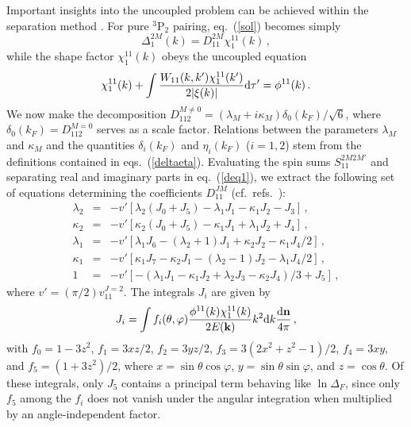 Important insights into the uncoupled problem can be achieved
within the separation method \cite {univ}.  For pure $^3$P$_2$ pairing,
eq.~(\ref{sol}) becomes simply
\begin{equation}
\Delta^{2M}_1(k)=D^{2M}_{11}\chi_1^{11}(k) \, ,
\label{dchi}
\end{equation}
while the shape factor $\chi_1^{11}(k)$ obeys the uncoupled equation
\begin{equation}
\chi_1^{11}(k) + \int \frac{W_{11}(k,k')\chi_1^{11}(k')}
        {2|\xi(k)|}{\rm d}\tau' =  \phi^{11}(k ) \,.
\label{samechi}
\end{equation}
We now make the decomposition 
$D^{M\neq 0}_{112}=(\lambda_M+i\kappa_M)\delta_0(k_F)/\sqrt{6}$,
where $\delta_0(k_F)=D^{M=0}_{112}$ serves as a scale
factor.  Relations between the parameters $\lambda_M$ and $\kappa_M$
and the quantities $\delta_i(k_F)$ and $\eta_i(k_F)$ ($i=1,2$) stem
from the definitions contained in eqs.~(\ref{deltaeta}).
Evaluating the spin sums $S^{2M2M'}_{11}$ and separating
real and imaginary parts in eq.~(\ref{deq1}), we extract the following
set of equations determining the coefficients $D_{11}^{JM}$
(cf.~refs.~\cite{univ,van}):
\begin{eqnarray}
    \lambda_2
&=& -v'[\lambda_2(J_0+J_5)-\lambda_1 J_1 -\kappa_1J_2-J_3]\, ,\nonumber \\
    \kappa_2
&=& -v'[\kappa_2(J_0+J_5)-\kappa_1 J_1 +\lambda_1J_2+J_4] \, ,\nonumber\\
    \lambda_1
&=& -v'[\lambda_1J_6-(\lambda_2+1)J_1+\kappa_2J_2-\kappa_1J_4/2]\, ,\nonumber\\
     \kappa_1
&=& -v'[\kappa_1J_7-\kappa_2J_1-(\lambda_2-1)J_2-\lambda_1J_4/2]\, ,\nonumber\\
1 &=&-v'[-(\lambda_1 J_1-\kappa_1 J_2+\lambda_2 J_3-\kappa_2 J_4)/3+J_5] \,,
\label{base2}
\end{eqnarray}
where $v'=(\pi/2)v_{11}^{J=2}$.  The integrals $J_i$ are given by
\cite{univ}
\begin{equation}
J_i = \int f_i(\theta,\varphi){\phi^{11}(k)\chi_1^{11}(k) \over
2E({\bf k})} k^2{\rm d} k {{\rm d }{\bf n}\over 4\pi} \, ,
\label{int10}
\end{equation}
with $f_0=1-3z^2$, $f_1=3xz/2$, $f_2=3yz/2$, $f_3=3(2x^2+z^2-1)/2$,
$f_4=3xy$, and $f_5=(1+3z^2)/2$, where $x=\sin\theta\cos\varphi$,
$y=\sin\theta\sin\varphi$, and $z=\cos\theta$.  Of these integrals,
only $J_5$ contains a principal term behaving like $\ln \Delta_F$, since
only $f_5$ among the $f_i$ does not vanish under the angular integration
when multiplied by an angle-independent factor.


